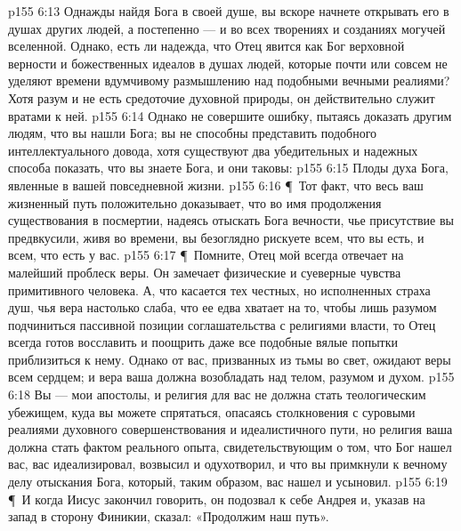 \vs p155 6:13 Однажды найдя Бога в своей душе, вы вскоре начнете открывать его в душах других людей, а постепенно --- и во всех творениях и созданиях могучей вселенной. Однако, есть ли надежда, что Отец явится как Бог верховной верности и божественных идеалов в душах людей, которые почти или совсем не уделяют времени вдумчивому размышлению над подобными вечными реалиями? Хотя разум и не есть средоточие духовной природы, он действительно служит вратами к ней.
\vs p155 6:14 Однако не совершите ошибку, пытаясь доказать другим людям, что вы нашли Бога; вы не способны представить подобного интеллектуального довода, хотя существуют два убедительных и надежных способа показать, что вы знаете Бога, и они таковы:
\vs p155 6:15 \bibnobreakspace Плоды духа Бога, явленные в вашей повседневной жизни.
\vs p155 6:16 \P\ \bibnobreakspace Тот факт, что весь ваш жизненный путь положительно доказывает, что во имя продолжения существования в посмертии, надеясь отыскать Бога вечности, чье присутствие вы предвкусили, живя во времени, вы безоглядно рискуете всем, что вы есть, и всем, что есть у вас.
\vs p155 6:17 \P\ Помните, Отец мой всегда отвечает на малейший проблеск веры. Он замечает физические и суеверные чувства примитивного человека. А, что касается тех честных, но исполненных страха душ, чья вера настолько слаба, что ее едва хватает на то, чтобы лишь разумом подчиниться пассивной позиции соглашательства с религиями власти, то Отец всегда готов восславить и поощрить даже все подобные вялые попытки приблизиться к нему. Однако от вас, призванных из тьмы во свет, ожидают веры всем сердцем; и вера ваша должна возобладать над телом, разумом и духом.
\vs p155 6:18 Вы --- мои апостолы, и религия для вас не должна стать теологическим убежищем, куда вы можете спрятаться, опасаясь столкновения с суровыми реалиями духовного совершенствования и идеалистичного пути, но религия ваша должна стать фактом реального опыта, свидетельствующим о том, что Бог нашел вас, вас идеализировал, возвысил и одухотворил, и что вы примкнули к вечному делу отыскания Бога, который, таким образом, вас нашел и усыновил.
\vs p155 6:19 \P\ И когда Иисус закончил говорить, он подозвал к себе Андрея и, указав на запад в сторону Финикии, сказал: «Продолжим наш путь».
